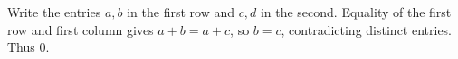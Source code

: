 Write the entries $ a,b $ in the first row and $ c,d $ in the second. Equality of the first row and first column gives $ a+b=a+c $, so $ b=c $, contradicting distinct entries. Thus $\boxed0 $.
